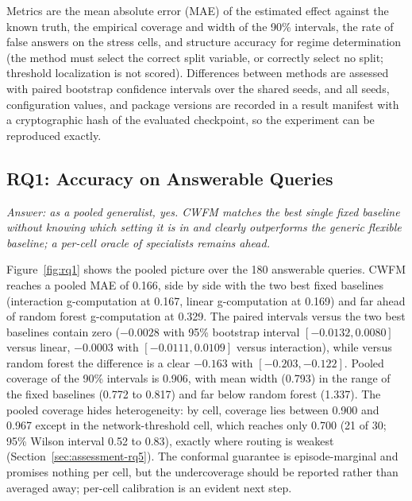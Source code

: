 \documentclass[electronics,article,submit,oneauthor]{Definitions/mdpi}
\begin{document}
Metrics are the mean absolute error (MAE) of the estimated effect against the known truth, the empirical coverage and width of the 90\% intervals, the rate of false answers on the stress cells, and structure accuracy for regime determination (the method must select the correct split variable, or correctly select no split; threshold localization is not scored). Differences between methods are assessed with paired bootstrap confidence intervals over the shared seeds, and all seeds, configuration values, and package versions are recorded in a result manifest with a cryptographic hash of the evaluated checkpoint, so the experiment can be reproduced exactly.

\subsection{RQ1: Accuracy on Answerable Queries}\label{sec:assessment-rq1}

\emph{Answer: as a pooled generalist, yes. CWFM matches the best single fixed baseline without knowing which setting it is in and clearly outperforms the generic flexible baseline; a per-cell oracle of specialists remains ahead.}

Figure~\ref{fig:rq1} shows the pooled picture over the 180 answerable queries. CWFM reaches a pooled MAE of 0.166, side by side with the two best fixed baselines (interaction g-computation at 0.167, linear g-computation at 0.169) and far ahead of random forest g-computation at 0.329. The paired intervals versus the two best baselines contain zero ($-0.0028$ with 95\% bootstrap interval $[-0.0132, 0.0080]$ versus linear, $-0.0003$ with $[-0.0111, 0.0109]$ versus interaction), while versus random forest the difference is a clear $-0.163$ with $[-0.203, -0.122]$. Pooled coverage of the 90\% intervals is 0.906, with mean width (0.793) in the range of the fixed baselines (0.772 to 0.817) and far below random forest (1.337). The pooled coverage hides heterogeneity: by cell, coverage lies between 0.900 and 0.967 except in the network-threshold cell, which reaches only 0.700 (21 of 30; 95\% Wilson interval 0.52 to 0.83), exactly where routing is weakest (Section~\ref{sec:assessment-rq5}). The conformal guarantee is episode-marginal and promises nothing per cell, but the undercoverage should be reported rather than averaged away; per-cell calibration is an evident next step.
\end{document}

